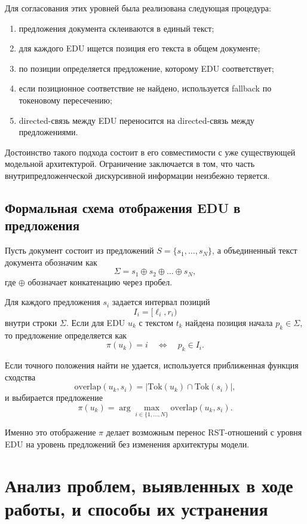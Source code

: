 \documentclass[12pt,a4paper]{article}
\begin{document}
Для согласования этих уровней была реализована следующая процедура:

\begin{enumerate}
    \item предложения документа склеиваются в единый текст;
    \item для каждого EDU ищется позиция его текста в общем документе;
    \item по позиции определяется предложение, которому EDU соответствует;
    \item если позиционное соответствие не найдено, используется fallback по токеновому
    пересечению;
    \item directed-связь между EDU переносится на directed-связь между предложениями.
\end{enumerate}

Достоинство такого подхода состоит в его совместимости с уже существующей модельной
архитектурой. Ограничение заключается в том, что часть внутрипредложенческой дискурсивной
информации неизбежно теряется.

\subsection{Формальная схема отображения EDU в предложения}

Пусть документ состоит из предложений $S=\{s_1,\dots,s_N\}$, а объединенный текст
документа обозначим как
\[
\Sigma = s_1 \oplus s_2 \oplus \dots \oplus s_N,
\]
где $\oplus$ обозначает конкатенацию через пробел.

Для каждого предложения $s_i$ задается интервал позиций
\[
I_i = [\ell_i, r_i)
\]
внутри строки $\Sigma$. Если для EDU $u_k$ с текстом $t_k$ найдена позиция начала
$p_k \in \Sigma$, то предложение определяется как
\[
\pi(u_k) = i \quad \Leftrightarrow \quad p_k \in I_i.
\]

Если точного положения найти не удается, используется приближенная функция сходства
\[
\mathrm{overlap}(u_k, s_i) = \left| \mathrm{Tok}(u_k) \cap \mathrm{Tok}(s_i) \right|,
\]
и выбирается предложение
\[
\pi(u_k) = \arg\max_{i \in \{1,\dots,N\}} \mathrm{overlap}(u_k, s_i).
\]

Именно это отображение $\pi$ делает возможным перенос RST-отношений с уровня EDU на
уровень предложений без изменения архитектуры модели.

\section{Анализ проблем, выявленных в ходе работы, и способы их устранения}
\end{document}
